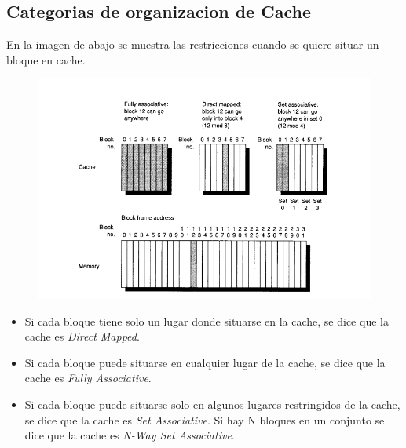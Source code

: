 \documentclass{article}
\begin{document}
\newpage
\subsection{Categorias de organizacion de Cache}

En la imagen de abajo se muestra las restricciones cuando se quiere situar un bloque en cache.


\begin{figure}[h!]
    \includegraphics[width=\linewidth]{imagenes/CategoriasCache.png}
\end{figure}


\begin{itemize} 
    \item Si cada bloque tiene solo un lugar donde situarse en la cache, se dice que la cache es \textit{Direct Mapped}.
    \item Si cada bloque puede situarse en cualquier lugar de la cache, se dice que la cache es \textit{Fully Associative}.
    \item Si cada bloque puede situarse solo en algunos lugares restringidos de la cache, se dice que la cache es \textit{Set Associative}. Si hay N bloques en un conjunto se dice que la cache es \textit{N-Way Set Associative}.
\end{itemize}
\end{document}
